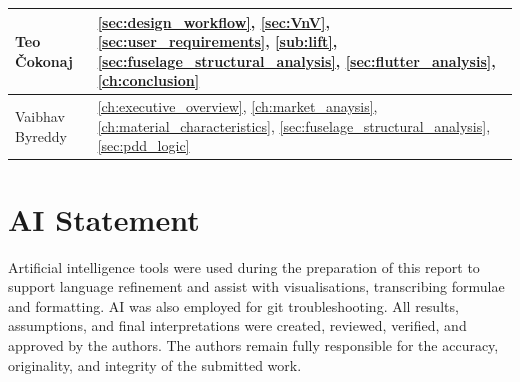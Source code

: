 \begin{table}[H]
\begin{tabularx}{\textwidth}{|>{\raggedright\arraybackslash}p{}|>{\raggedright\arraybackslash}X|}
        \\\hline 

        Teo Čokonaj &
        \autoref{sec:design_workflow}, \autoref{sec:VnV}, \autoref{sec:user_requirements}, \autoref{sub:lift},
        \autoref{sec:fuselage_structural_analysis}, \autoref{sec:flutter_analysis}, \autoref{ch:conclusion}
        
        \\\hline 

        Vaibhav Byreddy & 
        \autoref{ch:executive_overview}, \autoref{ch:market_anaysis}, \autoref{ch:material_characteristics}, \autoref{sec:fuselage_structural_analysis}, \autoref{sec:pdd_logic}
        
         \\\hline 
    \end{tabularx}
\end{table}


\section{AI Statement}

Artificial intelligence tools were used during the preparation of this report to support language refinement and assist with visualisations, transcribing formulae and formatting. AI was also employed for git troubleshooting. All results, assumptions, and final interpretations were created, reviewed, verified, and approved by the authors. The authors remain fully responsible for the accuracy, originality, and integrity of the submitted work.
